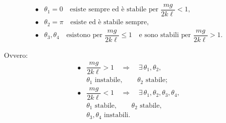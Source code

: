 \begin{example}{}
\[
\begin{array}{ll}
\bullet & \theta_1=0
\quad \text{esiste sempre ed è stabile per }
\dfrac{mg}{2k\ell}<1,
\\[4mm]
\bullet & \theta_2=\pi
\quad \text{esiste ed è stabile sempre},
\\[4mm]
\bullet & \theta_3,\theta_4
\quad \text{esistono per }
\dfrac{mg}{2k\ell}\leq 1
\quad \text{e sono stabili per }
\dfrac{mg}{2k\ell}>1.
\end{array}
\]

Ovvero:
\[
\begin{array}{ll}
\bullet &
\dfrac{mg}{2k\ell}>1
\quad \Longrightarrow \quad
\exists\,\theta_1,\theta_2,
\\[3mm]
&
\theta_1 \text{ instabile},
\qquad
\theta_2 \text{ stabile};
\\[6mm]
\bullet &
\dfrac{mg}{2k\ell}<1
\quad \Longrightarrow \quad
\exists\,\theta_1,\theta_2,\theta_3,\theta_4,
\\[3mm]
&
\theta_1 \text{ stabile},
\qquad
\theta_2 \text{ stabile},
\\[2mm]
&
\theta_3,\theta_4 \text{ instabili}.
\end{array}
\]
\end{example}
